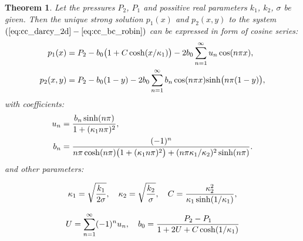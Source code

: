 \documentclass[sn-mathphys,Numbered]{sn-jnl}
\newtheorem{theorem}{Theorem}
\begin{document}
\begin{theorem}
\label{proposition_continuous}
Let the pressures $P_2$, $P_1$ and possitive real parameters $k_1$, $k_2$, $\sigma$ be given. Then the unique strong solution $p_1(x)$ and $p_2(x,y)$ to the system 
$(\ref{eq:cc_darcy_2d} - \ref{eq:cc_bc_robin})$ can be expressed in form of cosine series:
\begin{align}
    \label{eq:p1_series}
    p_1(x) &= P_2 - b_0\big(1 + C \cosh(x/\kappa_1)\big) -2b_0 \sum_{n=1}^\infty  u_n \cos(n \pi x),\\
    \label{eq:p2_series}
    p_2(x,y) &= P_2 - b_0(1-y) -2b_0 \sum_{n=1}^\infty b_n \cos(n \pi x) {\rm sinh} \big(n \pi(1-y)\big),
\end{align}
with coefficients:
\begin{align}
    \label{eq:un}
    u_n &= \frac{b_n \sinh(n \pi)}{1 + (\kappa_1 n \pi)^2},\\
    \label{eq:an}
    b_n &= \frac{(-1)^n}{n \pi \cosh(n \pi) \big(1 + (\kappa_1 n \pi)^2\big) 
    +  (n \pi \kappa_1 / \kappa_2)^2 \sinh(n\pi)}.
\end{align}
and other parameters:

\begin{equation}
    \label{eq:u0}
    \kappa_1 = \sqrt{\frac{k_1}{2\sigma}}, \quad     
    \kappa_2 = \sqrt{\frac{k_2}{\sigma}}, \quad
    C =  \frac{\kappa_2^2 }{\kappa_1\sinh(1/\kappa_1)},
\end{equation}

\begin{equation}
     \label{eq:b0}
     U =  \sum_{n=1}^{\infty} (-1)^n u_n, \quad
     b_0 = \frac{P_2 - P_1}{1 + 2  U + C\cosh(1/\kappa_1)} 
\end{equation}

\end{theorem}
\end{document}
